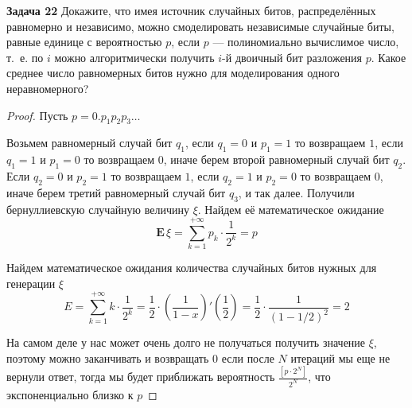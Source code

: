 \textbf{Задача 22} Докажите, что имея источник случайных битов, распределённых равномерно и независимо, можно смоделировать независимые случайные биты, равные единице с вероятностью $p$, если $p$ --- полиномиально вычислимое число, т.~е. по $i$ можно алгоритмически получить $i$-й двоичный бит разложения $p$. Какое среднее число равномерных битов нужно для моделирования одного неравномерного?

\begin{proof}
Пусть $p=0.p_1p_2p_3\ldots$

Возьмем равномерный случай бит $q_1$, если $q_1=0$ и $p_1=1$ то возвращаем $1$,
если $q_1=1$ и $p_1=0$ то возвращаем $0$, иначе берем второй равномерный случай бит $q_2$. Если $q_2=0$ и $p_2=1$ то возвращаем $1$,
если $q_2=1$ и $p_2=0$ то возвращаем $0$, иначе берем третий равномерный случай бит $q_3$, и так далее.
Получили бернуллиевскую случайную величину $\xi$. Найдем её математическое ожидание 
\[\mathbf{E}\,\xi = \sum_{k=1}^{+\infty}p_k\cdot\frac{1}{2^k} = p\]

Найдем математическое ожидания количества случайных битов нужных для генерации $\xi$
\[E = \sum_{k=1}^{+\infty} k \cdot \frac{1}{2^k} = \frac{1}{2}\cdot\left(\frac{1}{1-x}\right)'\left(\frac{1}{2}\right) = \frac{1}{2}\cdot\frac{1}{(1-1/2)^2}=2\]

На самом деле у нас может очень долго не получаться получить значение $\xi$, поэтому можно заканчивать и возвращать $0$ если после $N$ итераций мы еще не вернули ответ, тогда мы будет приближать вероятность $\frac{\left[p\cdot2^N\right]}{2^N}$, что экспоненциально близко к $p$
\end{proof}